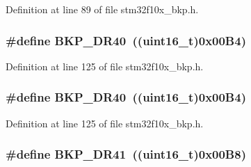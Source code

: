 Definition at line 89 of file stm32f10x\+\_\+bkp.\+h.

\subsubsection[{\texorpdfstring{B\+K\+P\+\_\+\+D\+R40}{BKP_DR40}}]{\setlength{\rightskip}{0pt plus 5cm}\#define B\+K\+P\+\_\+\+D\+R40~(({\bf uint16\+\_\+t})0x00\+B4)}\hypertarget{group___data___backup___register_ga17e0d382ac43abed1663846b5aecc09a}{}\label{group___data___backup___register_ga17e0d382ac43abed1663846b5aecc09a}


Definition at line 125 of file stm32f10x\+\_\+bkp.\+h.

\subsubsection[{\texorpdfstring{B\+K\+P\+\_\+\+D\+R40}{BKP_DR40}}]{\setlength{\rightskip}{0pt plus 5cm}\#define B\+K\+P\+\_\+\+D\+R40~(({\bf uint16\+\_\+t})0x00\+B4)}\hypertarget{group___data___backup___register_ga17e0d382ac43abed1663846b5aecc09a}{}\label{group___data___backup___register_ga17e0d382ac43abed1663846b5aecc09a}


Definition at line 125 of file stm32f10x\+\_\+bkp.\+h.

\subsubsection[{\texorpdfstring{B\+K\+P\+\_\+\+D\+R41}{BKP_DR41}}]{\setlength{\rightskip}{0pt plus 5cm}\#define B\+K\+P\+\_\+\+D\+R41~(({\bf uint16\+\_\+t})0x00\+B8)}\hypertarget{group___data___backup___register_gae1e184afc030987396716ddfad008e81}{}\label{group___data___backup___register_gae1e184afc030987396716ddfad008e81}


